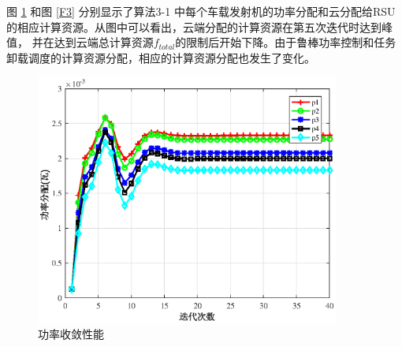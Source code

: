 图 \ref{F2} 和图 \ref{F3} 分别显示了算法3-1 中每个车载发射机的功率分配和云分配给RSU的相应计算资源。从图中可以看出，云端分配的计算资源在第五次迭代时达到峰值，
并在达到云端总计算资源$f_{total}$的限制后开始下降。由于鲁棒功率控制和任务卸载调度的计算资源分配，相应的计算资源分配也发生了变化。
\begin{figure}[H]
\centering
\includegraphics[width=10cm]{figures//chap3//pp.eps}
\caption{功率收敛性能}
\label{F2}
\end{figure}

